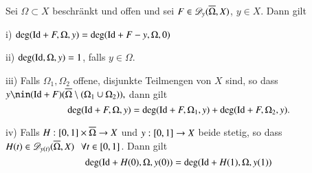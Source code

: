 \begin{theorem}\label{3.10}
    Sei $\Omega\subset X$ beschränkt und offen und sei $F\in \mathscr D_y(\overline\Omega,X)$, $y\in X$. Dann gilt
    \begin{description}
        \item{i)}
        $\deg(\mathrm{Id}+F,\Omega,y)=\deg(\mathrm{Id}+F-y,\Omega,0)$
        \item{ii)}
        $\deg(\mathrm{Id}, \Omega,y)=1$, falls $y\in \Omega.$
        \item{iii)}
        Falls $\Omega_1,\Omega_2$ offene, disjunkte Teilmengen von $X$ sind, so dass
        $y\nin (\Id+F)(\ol\Omega\setminus (\Omega_1\cup\Omega_2)),$ dann gilt
        \[
            \deg(\mathrm{Id}+F,\Omega,y)=\deg(\mathrm{Id}+F,\Omega_1,y)+\deg(\mathrm{Id}+F,\Omega_2,y).
        \]
        \item{iv)}
        Falls $H:[0,1]\times\overline\Omega\rightarrow X$ und $y:[0,1]\rightarrow X$ beide stetig, so dass $H(t)\in 
        \mathscr D_{y(t)}(\overline\Omega,X) \hspace{.25cm} \forall t\in [0,1]$. Dann gilt
        \[
            \deg(\mathrm{Id}+H(0),\Omega,y(0))=\deg(\mathrm{Id}+H(1), \Omega,y(1))
        \]
    \end{description}
\end{theorem}


